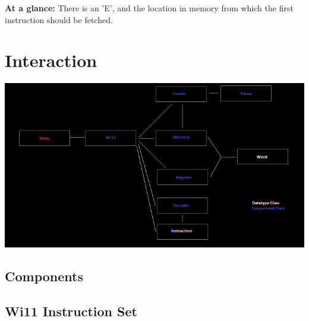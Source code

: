 \begin{DoxyParagraph}{}
{\bfseries At a glance:} There is an 'E', and the location in memory from which the first instruction should be fetched.
\end{DoxyParagraph}
\hypertarget{index_Component}{}\section{Interaction}\label{index_Component}

\begin{DoxyImageNoCaption}
  \mbox{\includegraphics[width=\textwidth]{software_interaction.png}}
\end{DoxyImageNoCaption}
 \hypertarget{index_components}{}\subsection{Components}\label{index_components}
\hypertarget{index_instructions}{}\subsection{Wi11 Instruction Set}\label{index_instructions}
